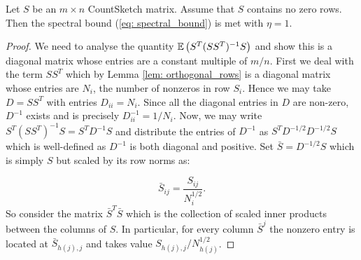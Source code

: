 \begin{thm} \label{thm: spectral-theorem}
  Let $S$ be an $m \times n$ CountSketch matrix.
  Assume that $S$ contains no zero rows.
  Then the spectral bound (\ref{eq: spectral_bound}) is met with $\eta = 1$.
\end{thm}

\begin{proof}
  We need to analyse the quantity $\mathbb{E} \left( S^T (S S^T)^{-1} S \right)$ and
  show this is a diagonal matrix whose entries are a constant multiple of $m/n$.
  First we deal with the term $SS^T$ which by Lemma \ref{lem: orthogonal_rows}
 is a diagonal matrix whose entries are $N_i$, the number of nonzeros in row
  $S_i$.
  Hence we may take $D = SS^T$ with entries $D_{ii} = N_i$.
  Since all the diagonal entries in $D$ are non-zero, $D^{-1}$ exists and is
  precisely $D^{-1}_{ii} = 1/ N_i$. %
  Now, we may write $S^T (SS^T)^{-1} S = S^T D^{-1} S $ and distribute the
  entries of $D^{-1}$ as $S^T D^{-1/2} D^{-1/2} S$ which is well-defined as
  $D^{-1}$ is both diagonal and positive.
  Set $\bar{S} = D^{-1/2} S$ which is simply $S$ but scaled by its row norms as:

  \begin{equation} \label{eq: S-bar_vals}
    \bar{S}_{ij} = \frac{S_{ij}}{N_i^{1/2}}.
  \end{equation}
  So consider the matrix $\bar{S}^T \bar{S}$ which is the collection
  of scaled inner products between the columns of $S$.
  In particular, for every column $\bar{S}^j$ the nonzero entry is located at
  $\bar{S}_{h(j),j}$ and takes value $S_{h(j),j}/N_{h(j)}^{1/2}$.



\end{proof}
